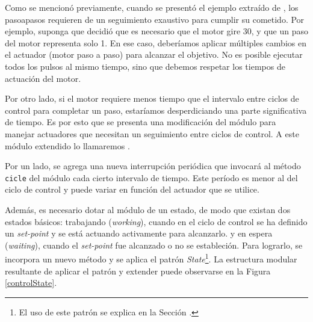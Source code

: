 
Como se mencionó previamente, cuando se presentó el ejemplo extraído de \cite{douglass}, los \glspl{pasoapaso} requieren de un seguimiento exaustivo para cumplir su cometido. Por ejemplo, suponga que \Control decidió que es necesario que el motor gire 30\textdegree, y que un paso del motor representa solo 1\textdegree. En ese caso, deberíamos aplicar múltiples cambios en el actuador (motor paso a paso) para alcanzar el objetivo. No es posible ejecutar todos los pulsos al mismo tiempo, sino que debemos respetar los tiempos de actuación del motor.

Por otro lado, si el motor requiere menos tiempo que el intervalo entre ciclos de control para completar un paso, estaríamos desperdiciando una parte significativa de tiempo. Es por esto que se presenta una modificación del módulo \Control para manejar actuadores que necesitan un seguimiento entre ciclos de control. A este módulo extendido lo llamaremos \ControlSeguimiento.

Por un lado, se agrega una nueva interrupción periódica que invocará al método \verb|cicle| del módulo \ControlSeguimiento cada cierto intervalo de tiempo. Este período es menor al del ciclo de control y puede variar en función del actuador que se utilice.

Además, es necesario dotar al módulo de un estado, de modo que existan dos estados básicos: trabajando (\textit{working}), cuando en el ciclo de control se ha definido un \textit{set-point} y se está actuando activamente para alcanzarlo. y en espera (\textit{waiting}), cuando el \textit{set-point} fue alcanzado o no se estableción. Para lograrlo, se incorpora un nuevo método y se aplica el patrón \textit{State}\footnote{El uso de este patrón se explica en la Sección .}. La estructura modular resultante de aplicar el patrón y extender \Control puede observarse en la Figura \ref{controlState}.

